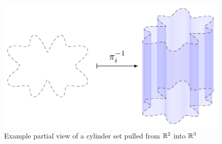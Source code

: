 \documentclass{fkpaper}
\begin{document}
\begin{multicols}{2}
  \begin{figure}[H]
    \centering
    \includegraphics{figures/cylinder-set-pullback-example.pdf}
    \caption{Example partial view of a cylinder set pulled from $\mathbb{R}^2$
      into $\mathbb{R}^3$}
    \label{fig:cylinder-set}
  \end{figure}


\end{multicols}
\end{document}
